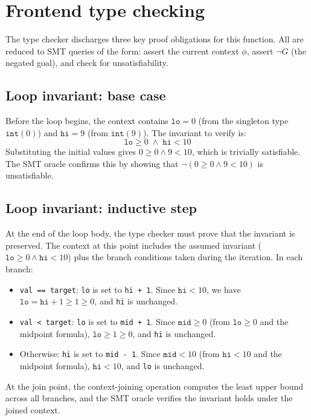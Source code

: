 \section{Frontend type checking}
%
The type checker discharges three key proof obligations for this function. All are reduced to SMT queries of the form: assert the current context $\phi$, assert $\lnot G$ (the negated goal), and check for unsatisfiability.
%
\subsection{Loop invariant: base case}
%
Before the loop begins, the context contains $\mathtt{lo} = 0$ (from the singleton type $\mathtt{int}(0)$) and $\mathtt{hi} = 9$ (from $\mathtt{int}(9)$). The invariant to verify is:
\[
  \mathtt{lo} \ge 0 \;\wedge\; \mathtt{hi} < 10
\]
Substituting the initial values gives $0 \ge 0 \wedge 9 < 10$, which is trivially satisfiable. The SMT oracle confirms this by showing that $\lnot(0 \ge 0 \wedge 9 < 10)$ is unsatisfiable.
%
\subsection{Loop invariant: inductive step}
%
At the end of the loop body, the type checker must prove that the invariant is preserved. The context at this point includes the assumed invariant ($\mathtt{lo} \ge 0 \wedge \mathtt{hi} < 10$) plus the branch conditions taken during the iteration. In each branch:
\begin{itemize}
  \item \texttt{val == target}: \texttt{lo} is set to \texttt{hi + 1}. Since $\mathtt{hi} < 10$, we have $\mathtt{lo} = \mathtt{hi} + 1 \ge 1 \ge 0$, and \texttt{hi} is unchanged.
  \item \texttt{val < target}: \texttt{lo} is set to \texttt{mid + 1}. Since $\mathtt{mid} \ge 0$ (from $\mathtt{lo} \ge 0$ and the midpoint formula), $\mathtt{lo} \ge 1 \ge 0$, and \texttt{hi} is unchanged.
  \item Otherwise: \texttt{hi} is set to \texttt{mid - 1}. Since $\mathtt{mid} < 10$ (from $\mathtt{hi} < 10$ and the midpoint formula), $\mathtt{hi} < 10$, and \texttt{lo} is unchanged.
\end{itemize}
%
At the join point, the context-joining operation computes the least upper bound across all branches, and the SMT oracle verifies the invariant holds under the joined context.
%
